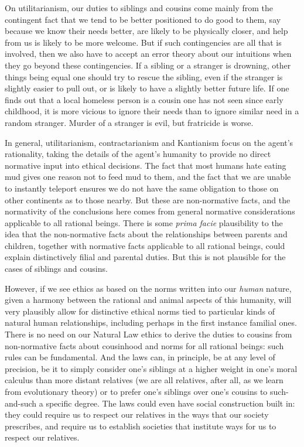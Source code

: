 On utilitarianism, our duties to siblings and cousins come mainly from the contingent fact that we tend to be better positioned to do good to them, say because we know
their needs better, are likely to be physically closer, and help from us is likely to be more welcome. But if such contingencies are all that is involved, then we also
have to accept an error theory about our intuitions when they go beyond these contingencies. If a sibling or a stranger is drowning, other things being equal one should
try to rescue the sibling, even if the stranger is slightly easier to pull out, or is likely to have a slightly better future life. If one finds out that a local
homeless person is a cousin one has not seen since early childhood, it is more vicious to ignore their needs than to ignore similar need in a random stranger.
Murder of a stranger is evil, but fratricide is worse.

In general, utilitarianism, contractarianism and Kantianism focus on the agent's rationality, taking the details of the agent's humanity to provide no direct normative
input into ethical decisions. The fact that most humans hate eating mud gives one reason not to feed mud to them, and the fact that we are unable to instantly
teleport ensures we do not have the same obligation to those on other continents as to those nearby. But these are non-normative facts, and the normativity of the
conclusions here comes from general normative considerations applicable to all rational beings. There is some \textit{prima facie} plausibility to the idea
that the non-normative facts about the relationships between parents and children, together with normative facts applicable to all rational beings, could explain
distinctively filial and parental duties. But this is not plausible for the cases of siblings and cousins.

However, if we see ethics as based on the norms written into our \textit{human} nature, given a harmony between the rational and animal aspects of this humanity,
will very plausibly allow for distinctive ethical norms tied to particular kinds of natural human relationships, including perhaps in the first instance familial ones.
There is no need on our Natural Law ethics to derive the duties to cousins from non-normative facts about cousinhood and norms for all rational beings: such rules
can be fundamental. And the laws can, in principle, be at any level of precision, be it to simply consider one's siblings at a higher weight in one's moral calculus
than more distant relatives (we are all relatives, after all, as we learn from evolutionary theory) or to prefer one's siblings over one's cousins to such-and-such
a specific degree. The laws could even have social construction built in: they could require us to respect our relatives in the ways that our society prescribes,
and require us to establish societies that institute ways for us to respect our relatives.

